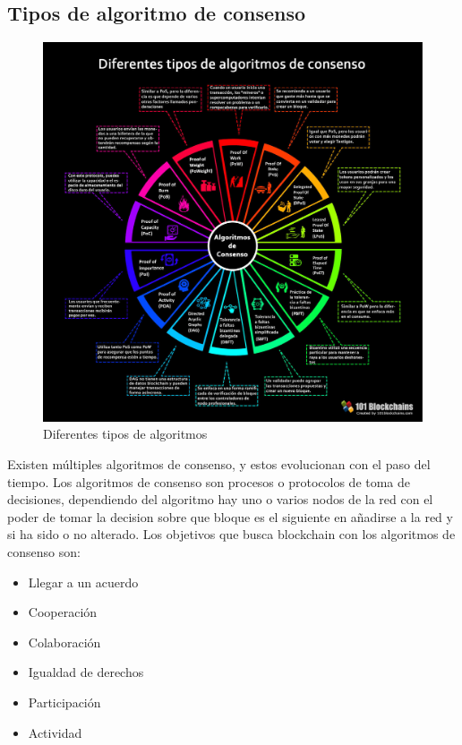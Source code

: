 \subsection{Tipos de algoritmo de consenso}

\begin{figure}[h!]
  \centering
  \includegraphics[width=0.8\linewidth]{figs/EstadoArte/Blockchain/algoritmosConsenso.jpeg}
  \caption[Algoritmos de Consenso]{Diferentes tipos de algoritmos}
  \label{fig:consenso}
\end{figure}

Existen múltiples algoritmos de consenso, y estos evolucionan con el paso del tiempo. Los algoritmos de consenso son procesos o protocolos de toma de decisiones, dependiendo del algoritmo hay uno o varios nodos de la red con el poder de tomar la decision sobre que bloque es el siguiente en añadirse a la red y si ha sido o no alterado. Los objetivos que busca blockchain con los algoritmos de consenso son:

\begin{itemize}
\item Llegar a un acuerdo
\item Cooperación
\item Colaboración
\item Igualdad de derechos
\item Participación
\item Actividad
\end{itemize}

